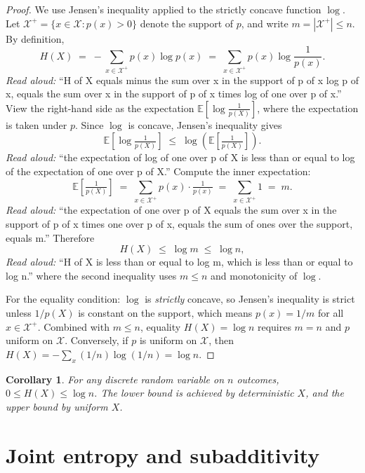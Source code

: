 \documentclass[11pt]{article}
\newtheorem{corollary}[theorem]{Corollary}
\theoremstyle{definition}
\begin{document}
\begin{proof}
We use Jensen's inequality applied to the strictly concave function $\log$.
Let $\mathcal{X}^+ = \{x \in \mathcal{X} : p(x) > 0\}$ denote the support of $p$,
and write $m = |\mathcal{X}^+| \le n$. By definition,
\[
H(X) \;=\; -\sum_{x \in \mathcal{X}^+} p(x) \log p(x)
       \;=\; \sum_{x \in \mathcal{X}^+} p(x) \log \frac{1}{p(x)}.
\]
\emph{Read aloud:} ``H of X equals minus the sum over x in the support of p of x log p of x, equals the sum over x in the support of p of x times log of one over p of x.''
View the right-hand side as the expectation
$\mathbb{E}\!\left[\log \tfrac{1}{p(X)}\right]$, where the expectation is taken under $p$.
Since $\log$ is concave, Jensen's inequality gives
\[
\mathbb{E}\!\left[\log \tfrac{1}{p(X)}\right]
   \;\le\; \log\!\left(\mathbb{E}\!\left[\tfrac{1}{p(X)}\right]\right).
\]
\emph{Read aloud:} ``the expectation of log of one over p of X is less than or equal to log of the expectation of one over p of X.''
Compute the inner expectation:
\[
\mathbb{E}\!\left[\tfrac{1}{p(X)}\right]
   \;=\; \sum_{x \in \mathcal{X}^+} p(x) \cdot \tfrac{1}{p(x)}
   \;=\; \sum_{x \in \mathcal{X}^+} 1
   \;=\; m.
\]
\emph{Read aloud:} ``the expectation of one over p of X equals the sum over x in the support of p of x times one over p of x, equals the sum of ones over the support, equals m.''
Therefore
\[
H(X) \;\le\; \log m \;\le\; \log n,
\]
\emph{Read aloud:} ``H of X is less than or equal to log m, which is less than or equal to log n.''
where the second inequality uses $m \le n$ and monotonicity of $\log$.

For the equality condition: $\log$ is \emph{strictly} concave, so Jensen's inequality
is strict unless $1/p(X)$ is constant on the support, which means $p(x) = 1/m$ for all
$x \in \mathcal{X}^+$. Combined with $m \le n$, equality $H(X) = \log n$ requires $m = n$
and $p$ uniform on $\mathcal{X}$. Conversely, if $p$ is uniform on $\mathcal{X}$, then
$H(X) = -\sum_{x} (1/n) \log(1/n) = \log n$.
\end{proof}

\begin{corollary}
For any discrete random variable on $n$ outcomes, $0 \le H(X) \le \log n$. The lower
bound is achieved by deterministic $X$, and the upper bound by uniform $X$.
\end{corollary}

\section{Joint entropy and subadditivity}
\end{document}
